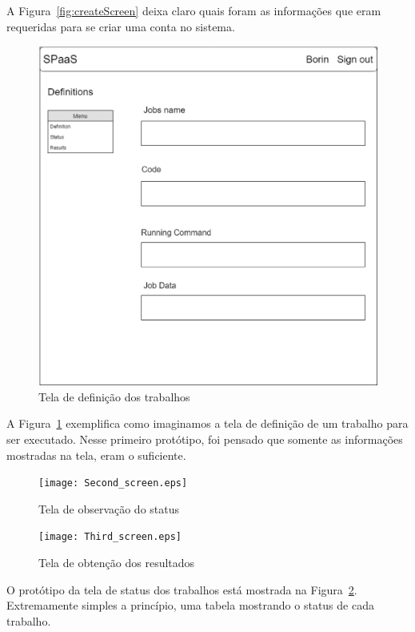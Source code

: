 \documentclass[11pt,twoside]{article}
\begin{document}
A Figura~\ref{fig:createScreen} deixa claro quais foram as informações que eram requeridas para se criar uma conta no sistema. 

\begin{figure}[!h]
  \centering
  \includegraphics[scale=0.2]{First_screen.eps}
  \caption{Tela de definição dos trabalhos}
  \label{fig:definitionScreen}
\end{figure}

A Figura~\ref{fig:definitionScreen} exemplifica como imaginamos a tela de definição de um trabalho para ser executado. Nesse primeiro protótipo, foi pensado que somente 
as informações mostradas na tela, eram o suficiente.

\begin{figure}[!h]
  \centering
  \texttt{[image: Second\_screen.eps]}
  \caption{Tela de observação do status}
  \label{fig:statusScreen}
\end{figure}

\begin{figure}[!h]
  \centering
  \texttt{[image: Third\_screen.eps]}
  \caption{Tela de obtenção dos resultados}
  \label{fig:resultsScreen}
\end{figure}

O protótipo da tela de status dos trabalhos está mostrada na Figura~\ref{fig:statusScreen}. Extremamente simples a princípio, uma tabela mostrando o status de cada trabalho. 
\end{document}
